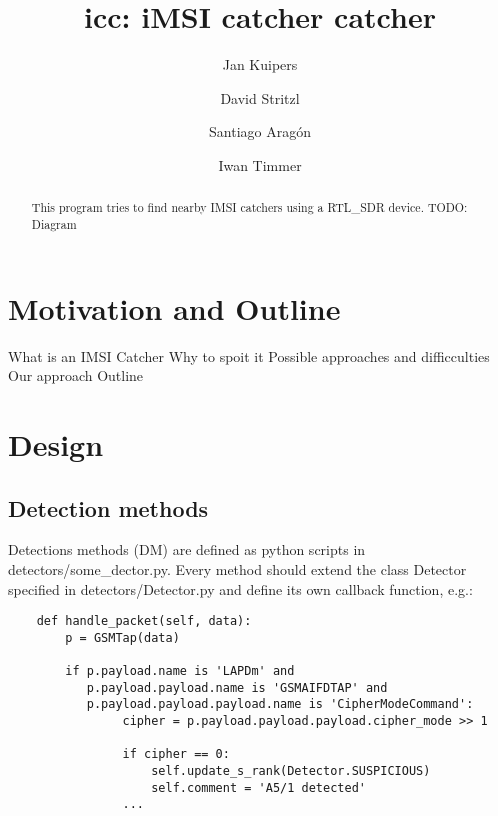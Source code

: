 \documentclass[preprint,12pt,3p]{elsarticle}
\begin{document}
\begin{frontmatter}

\title{icc: iMSI catcher catcher}

\author{Jan Kuipers}
\address{j.h.kuipers@student.utwente.nl}
\address{University of Twente}
\author{David Stritzl}
\address{david.stritzl@gmail.com}
\address{University of Twente}
\author{Santiago Aragón}
\address{s.e.aragonramirez@student.utwente.nl}
\address{University of Twente}
\author{Iwan Timmer}
\address{i.r.timmer@student.utwente.nl}
\address{University of Twente}
\begin{abstract}
This program tries to find nearby IMSI catchers using a RTL\_SDR device. TODO: Diagram
\end{abstract}


\end{frontmatter}





\section{Motivation and Outline}
What is an IMSI Catcher
Why to spoit it
Possible approaches and difficculties
Our approach
Outline
\section{Design}

\subsection{Detection methods}

Detections methods (DM) are defined as python scripts in detectors/some\_dector.py. Every method should extend the class Detector specified in detectors/Detector.py and define its own callback function, e.g.:
\lstset{language=Python}
\begin{lstlisting}
    def handle_packet(self, data):
        p = GSMTap(data)

        if p.payload.name is 'LAPDm' and
           p.payload.payload.name is 'GSMAIFDTAP' and
           p.payload.payload.payload.name is 'CipherModeCommand':
                cipher = p.payload.payload.payload.cipher_mode >> 1

                if cipher == 0:
                    self.update_s_rank(Detector.SUSPICIOUS)
                    self.comment = 'A5/1 detected'
                ...

\end{lstlisting}
\end{document}
